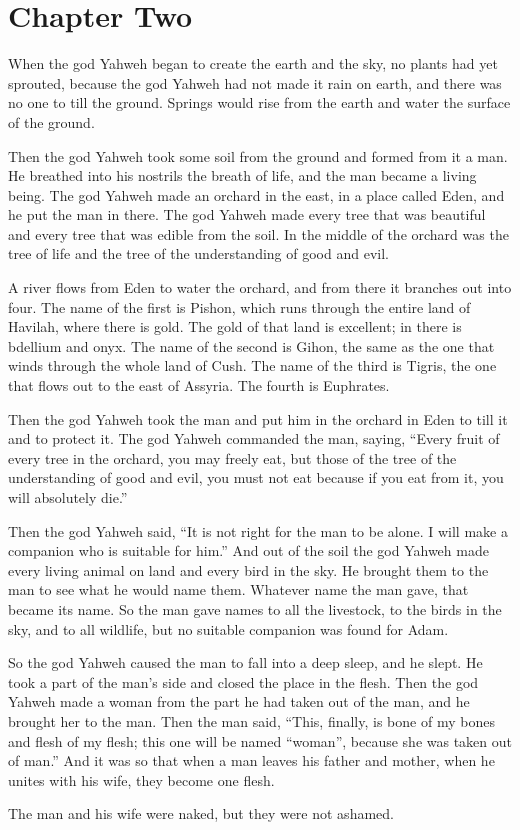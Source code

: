 \chapter*{Chapter Two}

When the god Yahweh began to create the earth and the sky, no plants had yet 
sprouted, because the god Yahweh had not made it rain on earth, 
and there was no one to till the ground.  Springs would rise from the earth 
and water the surface of the ground.

Then the god Yahweh took some soil from the ground and formed from it a man.  
He breathed into his nostrils the breath of life, and the man became 
a living being.  The god Yahweh made an orchard in the east, in a place called 
Eden, and he put the man in there.  The god Yahweh made every tree that was beautiful 
and every tree that was edible from the soil.  In the middle of the orchard was 
the tree of life and the tree of the understanding of good and evil.

A river flows from Eden to water the orchard, and from there it branches out 
into four.  The name of the first is Pishon, which runs through the entire land 
of Havilah, where there is gold.  The gold of that land is excellent; in there is 
bdellium and onyx.  The name of the second is Gihon, the same as the one that 
winds through the whole land of Cush.  The name of the third is Tigris, the one 
that flows out to the east of Assyria.  The fourth is Euphrates.

Then the god Yahweh took the man and put him in the orchard in Eden to till it 
and to protect it.  The god Yahweh commanded the man, saying, 
\enquote{Every fruit of every tree in the orchard, you may freely eat, but 
those of the tree of the understanding of good and evil, you must not eat 
because if you eat from it, you will absolutely die.}

Then the god Yahweh said, \enquote{It is not right for the man to be alone.  
I will make a companion who is suitable for him.} And out of the soil the god 
Yahweh made every living animal on land and every bird in the sky.  He brought 
them to the man to see what he would name them.  Whatever name the man gave, 
that became its name.  So the man gave names to all the livestock, to the birds 
in the sky, and to all wildlife, but no suitable companion was found for Adam.

So the god Yahweh caused the man to fall into a deep sleep, and he slept.  He 
took a part of the man's side and closed the place in the flesh.  Then the god 
Yahweh made a woman from the part he had taken out of the man, and he brought 
her to the man.  Then the man said, \enquote{This, finally, is bone of my bones 
and flesh of my flesh; this one will be named “woman”, because she was taken out 
of man.} And it was so that when a man leaves his father and mother, when he 
unites with his wife, they become one flesh.  

The man and his wife were naked, but they were not ashamed.
